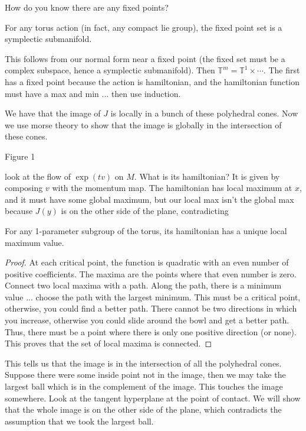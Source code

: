  How do you know there are any fixed points?
 \begin{lemma}
   For any torus action (in fact, any compact lie group), the fixed point set is a
   symplectic submanifold.
 \end{lemma}
 This follows from our normal form near a fixed point (the fixed set must be a complex
 subspace, hence a symplectic submanifold).  Then $\mathbb{T}^m=\mathbb{T}^1\times
 \cdots$. The first has a fixed point because the action is hamiltonian, and the
 hamiltonian function must have a max and min ... then use induction.

 We have that the image of $J$ is locally in a bunch of these polyhedral cones.  Now
 we use morse theory to show that the image is globally in the intersection of these
 cones.

 Figure 1

 look at the flow of $\exp(tv)$ on $M$.  What is its hamiltonian?  It is given by
 composing $v$ with the momentum map.  The hamiltonian has local maximum at $x$, and
 it must have some global maximum, but our local max isn't the global max because
 $J(y)$ is on the other side of the plane, contradicting
 \begin{lemma}
   For any 1-parameter subgroup of the torus, its hamiltonian has a unique local
   maximum value.
 \end{lemma}
 \begin{proof}
   At each critical point, the function is quadratic with an even number of positive
   coefficients.  The maxima are the points where that even number is zero.  Connect
   two local maxima with a path.  Along the path, there is a minimum value ... choose
   the path with the largest minimum.  This must be a critical point, otherwise, you
   could find a better path.  There cannot be two directions in which you increase,
   otherwise you could slide around the bowl and get a better path.  Thus, there must
   be a point where there is only one positive direction (or none).  This proves that
   the set of local maxima is connected.
 \end{proof}

 This tells us that the image is in the intersection of all the polyhedral cones.
 Suppose there were some inside point not in the image, then we may take the largest
 ball which is in the complement of the image.  This touches the
 image somewhere.  Look at the tangent hyperplane at the point of contact.  We will
 show that the whole image is on the other side of the plane, which contradicts the
 assumption that we took the largest ball.


